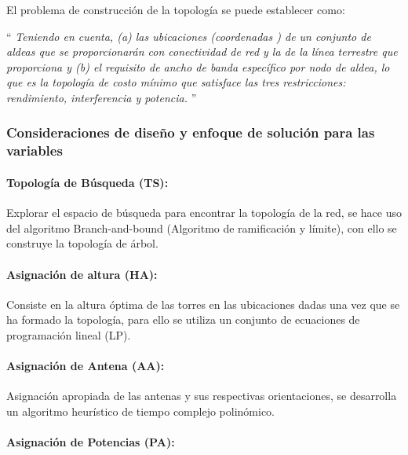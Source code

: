 \documentclass[]{article}
\let\oldparagraph\paragraph
\renewcommand{\paragraph}[1]{\oldparagraph{#1}\mbox{}}
\begin{document}
El problema de construcción de la topología se puede establecer como:

`` \emph{Teniendo en cuenta, (a) las ubicaciones (coordenadas
\(<x, y, z>\)) de un conjunto de aldeas que se proporcionarán con
conectividad de red y la de la línea terrestre que proporciona y (b) el
requisito de ancho de banda específico por nodo de aldea, lo que es la
topología de costo mínimo que satisface las tres restricciones:
rendimiento, interferencia y potencia.} ''

\subsubsection{Consideraciones de diseño y enfoque de solución para las
variables}\label{consideraciones-de-diseuxf1o-y-enfoque-de-soluciuxf3n-para-las-variables}

\paragraph{Topología de Búsqueda
(TS):}\label{topologuxeda-de-buxfasqueda-ts}

Explorar el espacio de búsqueda para encontrar la topología de la red,
se hace uso del algoritmo Branch-and-bound (Algoritmo de ramificación y
límite), con ello se construye la topología de árbol.

\paragraph{Asignación de altura (HA):}\label{asignaciuxf3n-de-altura-ha}

Consiste en la altura óptima de las torres en las ubicaciones dadas una
vez que se ha formado la topología, para ello se utiliza un conjunto de
ecuaciones de programación lineal (LP).

\paragraph{Asignación de Antena (AA):}\label{asignaciuxf3n-de-antena-aa}

Asignación apropiada de las antenas y sus respectivas orientaciones, se
desarrolla un algoritmo heurístico de tiempo complejo polinómico.

\paragraph{Asignación de Potencias
(PA):}\label{asignaciuxf3n-de-potencias-pa}
\end{document}
